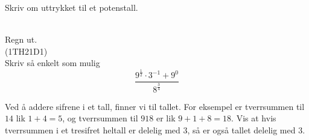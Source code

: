 Skriv om uttrykket til et potenstall. \os
{} \\[12pt]

 \\[12pt]


Regn ut.\os
{} \\[10pt]
\newpage
{} 
(1TH21D1) \\%
Skriv så enkelt som mulig
\[ \frac{9^{\frac{1}{2}}\cdot 3^{-1}+9^0}{8^{\frac{3}{4}}} \]

Ved å addere sifrene i et tall, finner vi  til tallet. For eksempel er tverrsummen til $ 14 $ lik $ 1+4=5 $, og tverrsummen til $ 918 $ er lik $ 9+1+8=18 $. Vis at hvis tverrsummen i et tresifret heltall er delelig med 3, så er også tallet delelig med 3.\vsk





